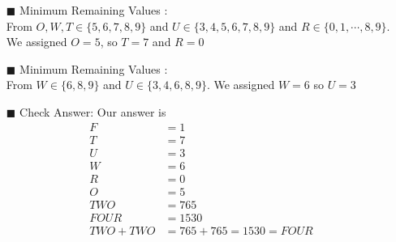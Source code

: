 \documentclass[12pt, a4paper]{article}
\begin{document}
\begin{enumerate}
\begin{itemize}
\begin{itemize}
	 	\item[$\blacksquare$] Minimum Remaining Values :\\
	 	From $O, W, T \in \{5,6,7,8,9\}$ and $U \in \{3,4,5, 6, 7, 8, 9\}$ and $R \in \{0, 1, \cdots, 8, 9\}$. We assigned $O = 5$, so $T = 7$ and $R = 0$
	 	
	 	\item[$\blacksquare$] Minimum Remaining Values :\\
	 	From $W \in \{6, 8, 9\}$ and $U \in \{3, 4, 6, 8, 9\}$.
	 	We assigned $W = 6$ so $U = 3$
	 	
	 	\item[$\blacksquare$] Check Answer:
	 	Our answer is 
	 	\begin{align*}
	 		F &= 1\\
	 		T &= 7\\
	 		U &= 3\\
	 		W &= 6\\
	 		R &= 0\\
	 		O &= 5\\
	 		TWO &= 765\\
	 		FOUR &= 1530\\
	 		TWO + TWO &= 765+765 = 1530 = FOUR
	 	\end{align*}
	 \end{itemize}
	\end{itemize}
	\end{enumerate}
\end{document}
